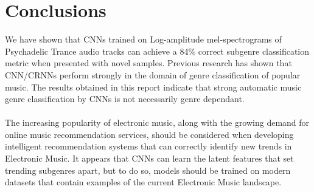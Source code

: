 \documentclass[12pt]{article}
\newcounter{ct}
\begin{document}
\section*{Conclusions}
We have shown that CNNs trained on 
Log-amplitude mel-spectrograms  
of Psychadelic Trance audio tracks can achieve a 84\% correct subgenre 
classification
metric when presented with novel samples. Previous research has
shown that CNN/CRNNs perform strongly in the domain of genre classification
of popular music. The results obtained in this report indicate that 
strong automatic
music genre classification by CNNs is not necessarily genre dependant. 
\\\\
The increasing popularity of electronic music, along with the growing demand
for online music recommendation services, 
should be considered when developing intelligent 
recommendation systems that can correctly identify 
new trends in Electronic Music. It appears that CNNs can learn 
the latent features that set trending subgenres apart, but to do so, 
models should be trained on 
modern datasets that contain examples of the current Electronic Music 
landscape.
\clearpage
\end{document}
